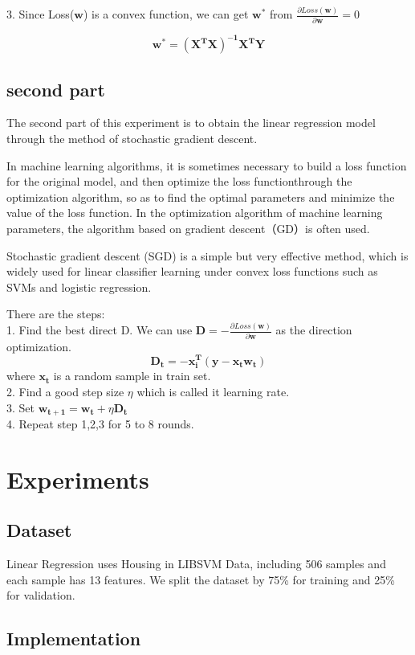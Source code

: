 \documentclass[journal, a4paper]{IEEEtran}
\begin{document}
3. Since Loss($\boldsymbol{w}$) is a convex function, we can get $\boldsymbol {w^*}$ from $\frac{\partial{Loss(\boldsymbol{w})}}{\partial{\boldsymbol{w}}}=0 $

$$\boldsymbol{w^*=(X^TX)^{-1}X^TY}$$

\subsection{second part}
\par The second part of this experiment is to obtain the linear regression model through the method of stochastic gradient descent. \par In machine learning algorithms, it is sometimes necessary to build a loss function for the original model, and then optimize the loss functionthrough the optimization algorithm, so as to find the optimal parameters and minimize the value of the loss function. In the optimization algorithm of machine learning parameters, the algorithm based on gradient descent（GD）is often used.
\par Stochastic gradient descent (SGD) is a simple but very effective method, which is widely used for linear classifier learning under convex loss functions such as SVMs and logistic regression.
\par There are the steps:
\\1. Find the best direct D. We can use $\boldsymbol{D}=-\frac{\partial{Loss(\boldsymbol{w})}}{\partial\boldsymbol{w}} $ as the direction optimization.
    $$\boldsymbol{D_{t}=-x_i^T(y-x_tw_t)}$$
    where $\boldsymbol{x_t}$ is a random sample in train set.
\\2. Find a good step size $\eta$ which is called it learning rate.
\\3. Set $\boldsymbol{w_{t+1}=w_t}+\eta\boldsymbol{D_t}$
\\4. Repeat step 1,2,3 for 5 to 8 rounds.

\section{Experiments}
\subsection{Dataset}
Linear Regression uses Housing in LIBSVM Data, including 506 samples and each sample has 13 features. We split the dataset by 75\% for training and 25\% for validation.

\subsection{Implementation}
\end{document}

